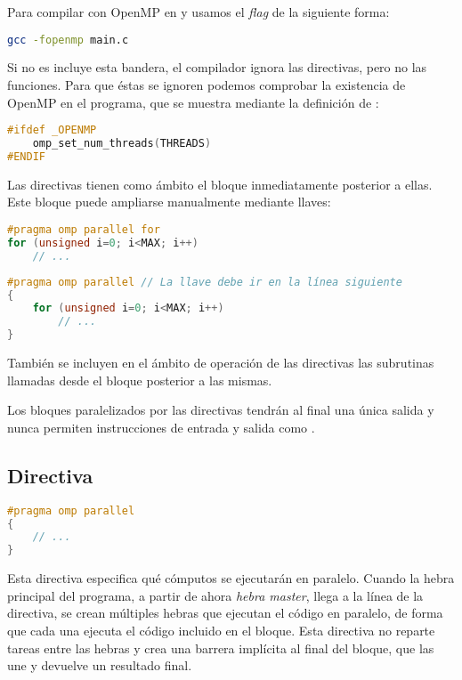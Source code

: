 Para compilar con OpenMP en  y  usamos el \textit{flag}  de la siguiente forma:

\begin{lstlisting}[language=sh]
gcc -fopenmp main.c
\end{lstlisting}

Si no es incluye esta bandera, el compilador ignora las directivas, pero no las funciones.
Para que éstas se ignoren podemos comprobar la existencia de OpenMP en el programa, que se muestra mediante la definición de :

\begin{lstlisting}[language=C]
#ifdef _OPENMP
	omp_set_num_threads(THREADS)
#ENDIF
\end{lstlisting}

Las directivas tienen como ámbito el bloque inmediatamente posterior a ellas.
Este bloque puede ampliarse manualmente mediante llaves:

\begin{lstlisting}[language=C]
#pragma omp parallel for
for (unsigned i=0; i<MAX; i++)
	// ...
\end{lstlisting}

\begin{lstlisting}[language=C]
#pragma omp parallel // La llave debe ir en la línea siguiente
{
	for (unsigned i=0; i<MAX; i++)
		// ...
}
\end{lstlisting}

También se incluyen en el ámbito de operación de las directivas las subrutinas llamadas desde el bloque posterior a las mismas.

Los bloques paralelizados por las directivas tendrán al final una única salida y nunca permiten instrucciones de entrada y salida como .

\subsection{Directiva }\label{directivas-openmp-directivas-parallel}

\begin{lstlisting}[language=C]
#pragma omp parallel
{
	// ...
}
\end{lstlisting}

Esta directiva especifica qué cómputos se ejecutarán en paralelo.
Cuando la hebra principal del programa, a partir de ahora \textit{hebra master}, llega a la línea de la directiva, se crean múltiples hebras que ejecutan el código en paralelo, de forma que cada una ejecuta el código incluido en el bloque.
Esta directiva no reparte tareas entre las hebras y crea una barrera implícita al final del bloque, que las une y devuelve un resultado final.

